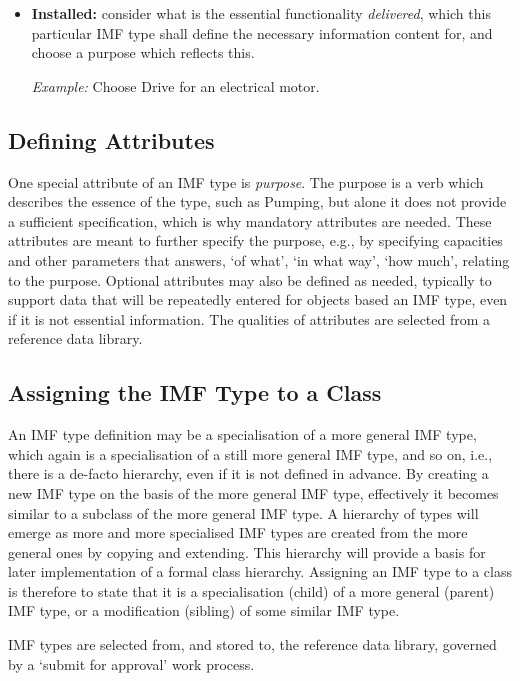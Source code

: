 \documentclass[../main.tex]{subfiles}
\begin{document}
\begin{itemize}
  \item \textbf{Installed:} consider what is the essential functionality \emph{delivered}, which this particular
        IMF type shall define the necessary information content for, and choose a purpose which reflects this.

          \textit{Example:} Choose Drive for an electrical motor.

\end{itemize}
\subsection{Defining Attributes}
One special attribute of an IMF type is \emph{purpose}. The purpose is a verb which describes the essence of the type, such as Pumping, but alone it does not provide a sufficient specification, which is why mandatory attributes are needed. These attributes are meant
to further specify the purpose, e.g., by specifying capacities and other parameters that answers, `of what', `in what
way', `how much', relating to the purpose. Optional attributes may also be defined as needed, typically to support data that will be repeatedly entered for objects based an IMF type, even if it is not essential information. The qualities of attributes are selected from a reference data library.

\subsection{Assigning the IMF Type to a Class}
An IMF type definition may be a specialisation of a more general IMF type, which again is a
specialisation of a still more general IMF type, and so on, i.e., there is a de-facto hierarchy, even if it is not defined in
advance. By creating a new IMF type on the basis of the more general IMF type, effectively it becomes 
similar to a subclass of the more general IMF type. A hierarchy of types will emerge as more and more
specialised IMF types are created from the more general ones by copying and extending. This hierarchy will provide a
basis for later implementation of a formal class hierarchy. Assigning an IMF type to a class is therefore to state
that it is a specialisation (child) of a more general (parent) IMF type, or a modification (sibling) of some similar
IMF type.

IMF types are selected from, and stored to, the reference data library, governed by a `submit for approval' work
process.
\end{document}
